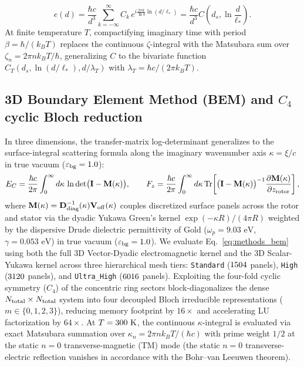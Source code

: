 \documentclass[11pt,letterpaper]{article}
\begin{document}
\begin{equation}
e(d) = \frac{\hbar c}{d^3} \sum_{k=-\infty}^{\infty} C_k \, e^{i \frac{2\pi k}{\ln b} \ln(d/\ell_*)} = \frac{\hbar c}{d^3} C\!\left(d_s, \ln\frac{d}{\ell_*}\right).
\end{equation}
At finite temperature $T$, compactifying imaginary time with period $\beta = \hbar/(k_B T)$ replaces the continuous $\zeta$-integral with the Matsubara sum over $\zeta_n = 2\pi n k_B T/\hbar$, generalizing $C$ to the bivariate function $C_T(d_s, \ln(d/\ell_*), d/\lambda_T)$ with $\lambda_T = \hbar c / (2\pi k_B T)$\cite{gordon2026prd}.

\subsection*{3D Boundary Element Method (BEM) and $C_4$ cyclic Bloch reduction}
In three dimensions, the transfer-matrix log-determinant generalizes to the surface-integral scattering formula along the imaginary wavenumber axis $\kappa = \xi/c$ in true vacuum ($\varepsilon_{\rm bg}=1.0$):
\begin{equation}
E_C = \frac{\hbar c}{2\pi} \int_0^\infty d\kappa \, \ln\det\bigl(\mathbf{I} - \mathbf{M}(\kappa)\bigr),
\qquad
F_z = \frac{\hbar c}{2\pi} \int_0^\infty d\kappa \, \mathrm{Tr}\!\left[\bigl(\mathbf{I} - \mathbf{M}(\kappa)\bigr)^{-1} \frac{\partial \mathbf{M}(\kappa)}{\partial z_{\rm rotor}}\right],
\label{eq:methods_bem}
\end{equation}
where $\mathbf{M}(\kappa) = \mathbf{D}_{\rm diag}^{-1}(\kappa)\mathbf{V}_{\rm off}(\kappa)$ couples discretized surface panels across the rotor and stator via the dyadic Yukawa Green's kernel $\exp(-\kappa R)/(4\pi R)$ weighted by the dispersive Drude dielectric permittivity of Gold ($\omega_p = 9.03\text{ eV}$, $\gamma = 0.053\text{ eV}$) in true vacuum ($\varepsilon_{\rm bg}=1.0$). We evaluate Eq.~\eqref{eq:methods_bem} using both the full 3D Vector-Dyadic electromagnetic kernel and the 3D Scalar-Yukawa kernel across three hierarchical mesh tiers: \texttt{Standard} ($1504{}$ panels), \texttt{High} ($3120{}$ panels), and \texttt{Ultra\_High} ($6016{}$ panels). Exploiting the four-fold cyclic symmetry ($C_4$) of the concentric ring sectors block-diagonalizes the dense $N_{\rm total} \times N_{\rm total}$ system into four decoupled Bloch irreducible representations ($m \in \{0, 1, 2, 3\}$), reducing memory footprint by $16\times$ and accelerating LU factorization by $64\times$. At $T = 300{}\text{ K}$, the continuous $\kappa$-integral is evaluated via exact Matsubara summation over $\kappa_n = 2\pi n k_B T / (\hbar c)$ with prime weight $1/2$ at the static $n=0$ transverse-magnetic (TM) mode (the static $n=0$ transverse-electric reflection vanishes in accordance with the Bohr--van Leeuwen theorem).
\end{document}
